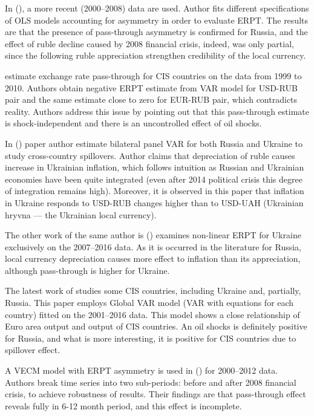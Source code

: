 \documentclass[12pt, a4paper]{extarticle}
\begin{document}
In (\cite{Kataranova2010}), a more recent (2000--2008) data are used. Author fits different specifications of OLS models accounting for asymmetry in order to evaluate ERPT. The results are that the presence of pass-through asymmetry is confirmed for Russia, and the effect of ruble decline caused by 2008 financial crisis, indeed, was only partial, since the following ruble appreciation strengthen credibility of the local currency.

\textcite{Beckmann2013} estimate exchange rate pass-through for CIS countries on the data from 1999 to 2010. Authors obtain negative ERPT estimate from VAR model for USD-RUB pair and the same estimate close to zero for EUR-RUB pair, which contradicts reality. Authors address this issue by pointing out that this pass-through estimate is shock-independent and there is an uncontrolled effect of oil shocks.

In (\cite{Faryna2016}) paper author estimate bilateral panel VAR for both Russia and Ukraine to study cross-country spillovers. Author claims that depreciation of ruble causes increase in Ukrainian inflation, which follows intuition as Russian and Ukrainian economies have been quite integrated (even after 2014 political crisis this degree of integration remains high). Moreover, it is observed in this paper that inflation in Ukraine responds to USD-RUB changes higher than to USD-UAH (Ukrainian hryvna --- the Ukrainian local currency). 

The other work of the same author is (\cite{Faryna2016a}) examines non-linear ERPT for Ukraine exclusively on the 2007--2016 data. As it is occurred in the literature for Russia, local currency depreciation causes more effect to inflation than its appreciation, although pass-through is higher for Ukraine.

The latest work of \textcite{Faryna2018} studies some CIS countries, including Ukraine and, partially, Russia. This paper employs Global VAR model (VAR with equations for each country) fitted on the 2001--2016 data. This model shows a close relationship of Euro area output and output of CIS countries. An oil shocks is definitely positive for Russia, and what is more interesting, it is positive for CIS countries due to spillover effect.

A VECM model with ERPT asymmetry is used in (\cite{Ponomarev2016}) for 2000--2012 data. Authors break time series into two sub-periods: before and after 2008 financial crisis, to achieve robustness of results. Their findings are that pass-through effect reveals fully in 6-12 month period, and this effect is incomplete.
\end{document}

